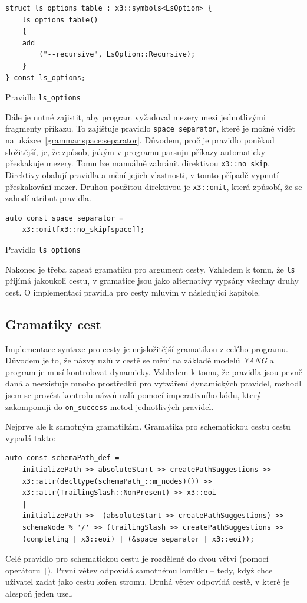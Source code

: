 \documentclass[thesis=B,czech,hidelinks]{FITthesis}[2019/03/06]
\begin{document}
\begin{listing}
\begin{verbatim}
struct ls_options_table : x3::symbols<LsOption> {
    ls_options_table()
    {
    add
        ("--recursive", LsOption::Recursive);
    }
} const ls_options;
\end{verbatim}
\caption{Pravidlo \texttt{ls\_options}}\label{grammar:ls:options}
\end{listing}

Dále je nutné zajistit, aby program vyžadoval mezery mezi jednotlivými fragmenty příkazu. To zajišťuje pravidlo \verb¨space_separator¨, které je možné vidět na ukázce~\ref{grammar:space:separator}. Důvodem, proč je pravidlo poněkud složitější, je, že způsob, jakým v programu parsuju příkazy automaticky přeskakuje mezery. Tomu lze manuálně zabránit direktivou \verb¨x3::no_skip¨. Direktivy obalují pravidla a mění jejich vlastnosti, v tomto případě vypnutí přeskakování mezer. Druhou použitou direktivou je \verb¨x3::omit¨, která způsobí, že se zahodí atribut pravidla.

\begin{listing}
\begin{verbatim}
auto const space_separator =
    x3::omit[x3::no_skip[space]];
\end{verbatim}
\caption{Pravidlo \texttt{ls\_options}}\label{grammar:ls:options}
\end{listing}

Nakonec je třeba zapsat gramatiku pro argument cesty. Vzhledem k tomu, že \texttt{ls} přijímá jakoukoli cestu, v gramatice jsou jako alternativy vypsány všechny druhy cest. O implementaci pravidla pro cesty mluvím v následující kapitole.

\subsection{Gramatiky cest}
Implementace syntaxe pro cesty je nejsložitější gramatikou z celého programu. Důvodem je to, že názvy uzlů v cestě se mění na základě modelů \textit{YANG} a program je musí kontrolovat dynamicky. Vzhledem k tomu, že pravidla jsou pevně daná a neexistuje mnoho prostředků pro vytváření dynamických pravidel, rozhodl jsem se provést kontrolu názvů uzlů pomocí imperativního kódu, který zakomponuji do \verb¨on_success¨ metod jednotlivých pravidel.

Nejprve ale k samotným gramatikám. Gramatika pro schematickou cestu cestu vypadá takto:
\begin{verbatim}
auto const schemaPath_def =
    initializePath >> absoluteStart >> createPathSuggestions >>
    x3::attr(decltype(schemaPath_::m_nodes)()) >>
    x3::attr(TrailingSlash::NonPresent) >> x3::eoi
    |
    initializePath >> -(absoluteStart >> createPathSuggestions) >>
    schemaNode % '/' >> (trailingSlash >> createPathSuggestions >>
    (completing | x3::eoi) | (&space_separator | x3::eoi));

\end{verbatim}
Celé pravidlo pro schematickou cestu je rozdělené do dvou větví (pomocí operátoru \texttt{|}). První větev odpovídá samotnému lomítku -- tedy, když chce uživatel zadat jako cestu kořen stromu. Druhá větev odpovídá cestě, v které je alespoň jeden uzel.
\end{document}
